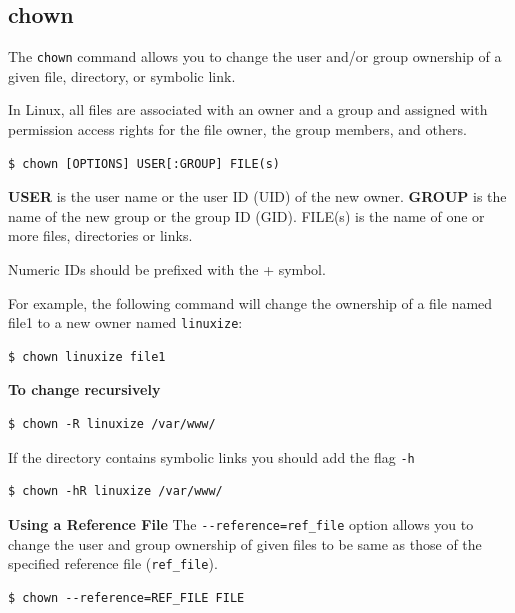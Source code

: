 \documentclass{article}
\newenvironment{blocktemplate}[1]{%
    \tcolorbox[beamer,%
    noparskip,breakable,
    colframe=Blue,%
    colbacklower=LimeGreen!75!LightGreen,%
    title=#1]}%
    {\endtcolorbox}
\newenvironment{blocktemplateII}[1]{%
    \tcolorbox[beamer,%
    noparskip,breakable,
    colframe=Green,%
    colbacklower=LimeGreen!75!LightGreen,%
    title=#1]}%
    {\endtcolorbox}
\newenvironment{codetemplate}[1][]{%
  \mybasecolorbox[#1]
  \itshape
}{%
  \endmybasecolorbox
}
\begin{document}
\subsection{chown}
The \verb|chown| command allows you to change the user and/or group ownership of a given file, directory, or symbolic link.

In Linux, all files are associated with an owner and a group and assigned with permission access rights for the file owner, the group members, and others.

\begin{codetemplate}{}
\begin{verbatim}
$ chown [OPTIONS] USER[:GROUP] FILE(s)
\end{verbatim}
\end{codetemplate}

\textbf{USER} is the user name or the user ID (UID) of the new owner. \textbf{GROUP} is the name of the new group or the group ID (GID). FILE(s) is the name of one or more files, directories or links.

\begin{blocktemplate}{NOTE}
Numeric IDs should be prefixed with the + symbol.
\end{blocktemplate}

For example, the following command will change the ownership of a file named file1 to a new owner named \verb|linuxize|:
\begin{codetemplate}{}
\begin{verbatim}
$ chown linuxize file1
\end{verbatim}
\end{codetemplate}

\textbf{To change recursively}
\begin{codetemplate}{}
\begin{verbatim}
$ chown -R linuxize /var/www/
\end{verbatim}
\end{codetemplate}

\begin{blocktemplateII}{NOTE}
If the directory contains symbolic links you should add the flag \verb|-h|
\begin{codetemplate}{}
\begin{verbatim}
$ chown -hR linuxize /var/www/
\end{verbatim}
\end{codetemplate}
\end{blocktemplateII}

\textbf{Using a Reference File}
The \verb|--reference=ref_file| option allows you to change the user and group ownership of given files to be same as those of the specified reference file (\verb|ref_file|). 
\begin{codetemplate}{}
\begin{verbatim}
$ chown --reference=REF_FILE FILE
\end{verbatim}
\end{codetemplate}
\end{document}

